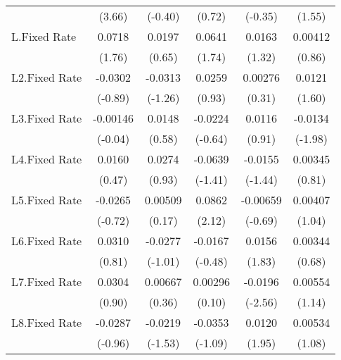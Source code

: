 {\begin{longtable}{l*{5}{c}}
                &   (3.66)         &  (-0.40)         &   (0.72)         &  (-0.35)         &   (1.55)         \\
[1em]
L.Fixed Rate    &   0.0718         &   0.0197         &   0.0641         &   0.0163         &  0.00412         \\
                &   (1.76)         &   (0.65)         &   (1.74)         &   (1.32)         &   (0.86)         \\
[1em]
L2.Fixed Rate   &  -0.0302         &  -0.0313         &   0.0259         &  0.00276         &   0.0121         \\
                &  (-0.89)         &  (-1.26)         &   (0.93)         &   (0.31)         &   (1.60)         \\
[1em]
L3.Fixed Rate   & -0.00146         &   0.0148         &  -0.0224         &   0.0116         &  -0.0134\sym{*}  \\
                &  (-0.04)         &   (0.58)         &  (-0.64)         &   (0.91)         &  (-1.98)         \\
[1em]
L4.Fixed Rate   &   0.0160         &   0.0274         &  -0.0639         &  -0.0155         &  0.00345         \\
                &   (0.47)         &   (0.93)         &  (-1.41)         &  (-1.44)         &   (0.81)         \\
[1em]
L5.Fixed Rate   &  -0.0265         &  0.00509         &   0.0862\sym{*}  & -0.00659         &  0.00407         \\
                &  (-0.72)         &   (0.17)         &   (2.12)         &  (-0.69)         &   (1.04)         \\
[1em]
L6.Fixed Rate   &   0.0310         &  -0.0277         &  -0.0167         &   0.0156         &  0.00344         \\
                &   (0.81)         &  (-1.01)         &  (-0.48)         &   (1.83)         &   (0.68)         \\
[1em]
L7.Fixed Rate   &   0.0304         &  0.00667         &  0.00296         &  -0.0196\sym{*}  &  0.00554         \\
                &   (0.90)         &   (0.36)         &   (0.10)         &  (-2.56)         &   (1.14)         \\
[1em]
L8.Fixed Rate   &  -0.0287         &  -0.0219         &  -0.0353         &   0.0120         &  0.00534         \\
                &  (-0.96)         &  (-1.53)         &  (-1.09)         &   (1.95)         &   (1.08)         \\

\end{longtable}}
